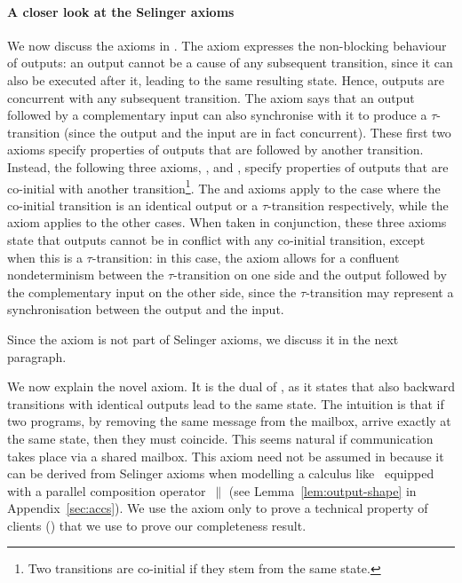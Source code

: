 \paragraph{A closer look at the Selinger axioms}
We now discuss the axioms in .
The \outputcommutativity axiom expresses the non-blocking behaviour of
outputs: %
an output cannot be a cause of any subsequent transition, since it can
also be executed after it, leading to the same resulting state. Hence,
outputs are concurrent with any subsequent transition.  The
\outputfeedback axiom says that an output followed by a complementary
input can also synchronise with it to produce a $\tau$-transition
(since the output and the input are in fact concurrent). These first
two axioms specify properties of outputs that are followed by another
transition. Instead, the following three axioms, \outputconfluence,
\outputdeterminacy and \outputtau, specify properties of outputs that
are co-initial with another transition\footnote{Two transitions are
  co-initial if they stem from the same state.}. The
\outputdeterminacy and \outputtau axioms apply to the case where the
co-initial transition is an identical output or a $\tau$-transition
respectively, while the \outputconfluence axiom applies to the other
cases.  When taken in conjunction, these three axioms state that outputs
cannot be in conflict %
with any co-initial transition, except when this is a
$\tau$-transition: in this case, the \outputtau axiom allows for a
confluent nondeterminism between the $\tau$-transition on one side and
the output followed by the complementary input on the other side,
since the $\tau$-transition may represent a synchronisation between the
output and the input.

Since the axiom \outputdeterminacyinv is not part of Selinger
axioms, we discuss it in the next paragraph.



We now explain the novel
\outputdeterminacyinv axiom.
It is the dual of \outputdeterminacy, as it states that
also backward transitions with identical outputs lead to the same
state. The intuition is that if two programs, by removing the
same message from the mailbox, arrive exactly at the same
state, then
they must coincide. This seems natural if communication takes place
via a shared mailbox.
This axiom need not be assumed in \cite{DBLP:conf/concur/Selinger97}
because it can be derived from Selinger axioms when modelling a calculus like~\ACCS
equipped with a parallel composition operator~$\parallel$ (see
Lemma~\ref{lem:output-shape} in Appendix~\ref{sec:accs}).
We use the \outputdeterminacyinv axiom only to prove a technical property of clients () that we use to prove our completeness result.


